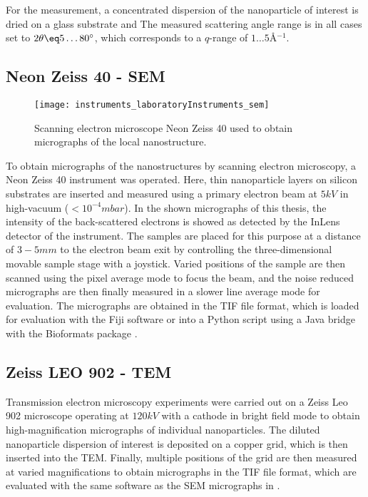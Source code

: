 \documentclass[\main/dresen_thesis.tex]{subfiles}
\begin{document}
    For the measurement, a concentrated dispersion of the nanoparticle of interest is dried on a glass substrate and
    The measured scattering angle range is in all cases set to $2 \theta \eq 5 \ldots 80^\circ$, which corresponds to a $q$-range of $1 \ldots 5 \unit{\angstrom^{-1}}$.


    \subsection{Neon Zeiss 40 - SEM}
      \label{ch:instruments:laboratoryInstruments:sem}
      \begin{figure}[ht]
        \centering
        \texttt{[image: instruments\_laboratoryInstruments\_sem]}
        \caption{\label{fig:appendix:instruments:sem}Scanning electron microscope Neon Zeiss 40 used to obtain micrographs of the local nanostructure.}
      \end{figure}
      To obtain micrographs of the nanostructures by scanning electron microscopy, a Neon Zeiss 40 instrument was operated.
      Here, thin nanoparticle layers on silicon substrates are inserted and measured using a primary electron beam at $5 \unit{kV}$ in high-vacuum ($< 10^{-4} \unit{mbar}$).
      In the shown micrographs of this thesis, the intensity of the back-scattered electrons is showed as detected by the InLens detector of the instrument.
      The samples are placed for this purpose at a distance of $3 - 5 \unit{mm}$ to the electron beam exit by controlling the three-dimensional movable sample stage with a joystick.
      Varied positions of the sample are then scanned using the pixel average mode to focus the beam, and the noise reduced micrographs are then finally measured in a slower line average mode for evaluation.
      The micrographs are obtained in the TIF file format, which is loaded for evaluation with the Fiji software \cite{Schindelin_2012_Fijia} or into a Python script using a Java bridge with the Bioformats package \cite{Linkert_2010_Metad}.

    \subsection{Zeiss LEO 902 - TEM}
      \label{ch:instruments:laboratoryInstruments:tem}
      Transmission electron microscopy experiments were carried out on a Zeiss Leo 902 microscope operating at $120 \unit{kV}$ with a  cathode in bright field mode to obtain high-magnification micrographs of individual nanoparticles.
      The diluted nanoparticle dispersion of interest is deposited on a copper grid, which is then inserted into the TEM.
      Finally, multiple positions of the grid are then measured at varied magnifications to obtain micrographs in the TIF file format, which are evaluated with the same software as the SEM micrographs in .
\end{document}
